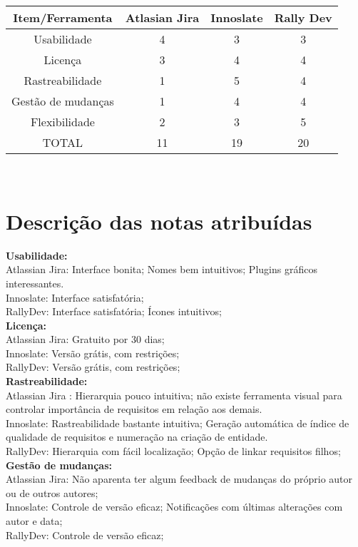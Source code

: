 \begin{tabular}{| c | c | c | c |} \hline
Item/Ferramenta & Atlasian Jira  & Innoslate & Rally Dev \\ \hline
Usabilidade & 4 & 3 & 3 \\
Licença & 3 & 4 & 4 \\
Rastreabilidade & 1 & 5 & 4 \\
Gestão de mudanças & 1 & 4 & 4 \\
Flexibilidade & 2 & 3 & 5  \\ \hline
TOTAL & 11 & 19 & 20 \\ \hline

\end{tabular} \\

\section {\large{Descrição das notas atribuídas}}

\textbf{Usabilidade:}\\
\tab Atlassian Jira: Interface bonita; Nomes bem intuitivos; Plugins gráficos interessantes.\\
\tab Innoslate: Interface satisfatória; \\
\tab RallyDev: Interface satisfatória; Ícones intuitivos;\\

\textbf{Licença:}\\
\tab Atlassian Jira: Gratuito por 30 dias;\\
\tab Innoslate: Versão grátis, com restrições;\\
\tab RallyDev: Versão grátis, com restrições;\\

\textbf{Rastreabilidade:}\\
\tab Atlassian Jira : Hierarquia pouco intuitiva; não existe ferramenta visual para controlar importância de requisitos em relação aos demais.\\
\tab Innoslate: Rastreabilidade bastante intuitiva; Geração automática de índice de qualidade de requisitos e numeração na criação de entidade.\\
\tab RallyDev: Hierarquia com fácil localização; Opção de linkar requisitos filhos;\\

\textbf{Gestão de mudanças:}\\
\tab Atlassian Jira: Não aparenta ter algum feedback de mudanças do próprio autor ou de outros autores;\\
\tab Innoslate: Controle de versão eficaz; Notificações com últimas alterações com autor e data;\\
\tab RallyDev: Controle de versão eficaz;\\

